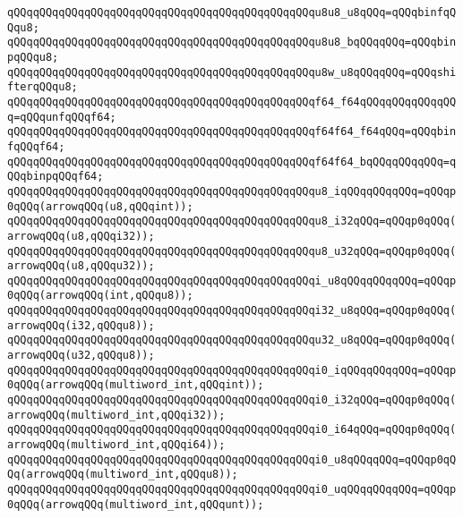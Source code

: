 \verb|qQQqqQQqqQQqqQQqqQQqqQQqqQQqqQQqqQQqqQQqqQQqqQQqu8u8_u8qQQq=qQQqbinfqQQqu8;|\newline
\verb|qQQqqQQqqQQqqQQqqQQqqQQqqQQqqQQqqQQqqQQqqQQqqQQqu8u8_bqQQqqQQq=qQQqbinpqQQqu8;|\newline
\verb|qQQqqQQqqQQqqQQqqQQqqQQqqQQqqQQqqQQqqQQqqQQqqQQqu8w_u8qQQqqQQq=qQQqshifterqQQqu8;|\newline
\newline
\verb|qQQqqQQqqQQqqQQqqQQqqQQqqQQqqQQqqQQqqQQqqQQqqQQqf64_f64qQQqqQQqqQQqqQQq=qQQqunfqQQqf64;|\newline
\verb|qQQqqQQqqQQqqQQqqQQqqQQqqQQqqQQqqQQqqQQqqQQqqQQqf64f64_f64qQQq=qQQqbinfqQQqf64;|\newline
\verb|qQQqqQQqqQQqqQQqqQQqqQQqqQQqqQQqqQQqqQQqqQQqqQQqf64f64_bqQQqqQQqqQQq=qQQqbinpqQQqf64;|\newline
\newline
\verb|qQQqqQQqqQQqqQQqqQQqqQQqqQQqqQQqqQQqqQQqqQQqqQQqu8_iqQQqqQQqqQQq=qQQqp0qQQq(arrowqQQq(u8,qQQqint));|\newline
\verb|qQQqqQQqqQQqqQQqqQQqqQQqqQQqqQQqqQQqqQQqqQQqqQQqu8_i32qQQq=qQQqp0qQQq(arrowqQQq(u8,qQQqi32));|\newline
\verb|qQQqqQQqqQQqqQQqqQQqqQQqqQQqqQQqqQQqqQQqqQQqqQQqu8_u32qQQq=qQQqp0qQQq(arrowqQQq(u8,qQQqu32));|\newline
\verb|qQQqqQQqqQQqqQQqqQQqqQQqqQQqqQQqqQQqqQQqqQQqqQQqi_u8qQQqqQQqqQQq=qQQqp0qQQq(arrowqQQq(int,qQQqu8));|\newline
\verb|qQQqqQQqqQQqqQQqqQQqqQQqqQQqqQQqqQQqqQQqqQQqqQQqi32_u8qQQq=qQQqp0qQQq(arrowqQQq(i32,qQQqu8));|\newline
\verb|qQQqqQQqqQQqqQQqqQQqqQQqqQQqqQQqqQQqqQQqqQQqqQQqu32_u8qQQq=qQQqp0qQQq(arrowqQQq(u32,qQQqu8));|\newline
\newline
\verb|qQQqqQQqqQQqqQQqqQQqqQQqqQQqqQQqqQQqqQQqqQQqqQQqi0_iqQQqqQQqqQQq=qQQqp0qQQq(arrowqQQq(multiword_int,qQQqint));|\newline
\verb|qQQqqQQqqQQqqQQqqQQqqQQqqQQqqQQqqQQqqQQqqQQqqQQqi0_i32qQQq=qQQqp0qQQq(arrowqQQq(multiword_int,qQQqi32));|\newline
\verb|qQQqqQQqqQQqqQQqqQQqqQQqqQQqqQQqqQQqqQQqqQQqqQQqi0_i64qQQq=qQQqp0qQQq(arrowqQQq(multiword_int,qQQqi64));|\newline
\verb|qQQqqQQqqQQqqQQqqQQqqQQqqQQqqQQqqQQqqQQqqQQqqQQqi0_u8qQQqqQQq=qQQqp0qQQq(arrowqQQq(multiword_int,qQQqu8));|\newline
\verb|qQQqqQQqqQQqqQQqqQQqqQQqqQQqqQQqqQQqqQQqqQQqqQQqi0_uqQQqqQQqqQQq=qQQqp0qQQq(arrowqQQq(multiword_int,qQQqunt));|\newline
